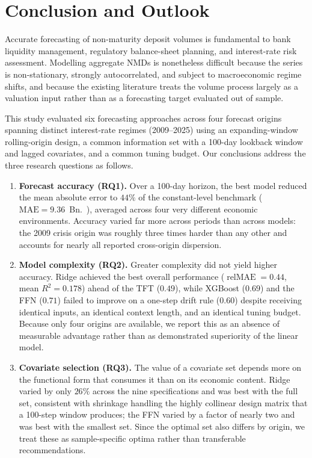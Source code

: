 \documentclass[11pt,a4paper]{article}
\begin{document}
\section{Conclusion and Outlook}
\label{sec:conclusion}

Accurate forecasting of non-maturity deposit volumes is fundamental to bank
liquidity management, regulatory balance-sheet planning, and interest-rate
risk assessment. Modelling aggregate NMDs is nonetheless difficult because the
series is non-stationary, strongly autocorrelated, and subject to
macroeconomic regime shifts, and because the existing literature treats the
volume process largely as a valuation input rather than as a forecasting
target evaluated out of sample.

This study evaluated six forecasting approaches across four forecast origins
spanning distinct interest-rate regimes (2009--2025) using an expanding-window
rolling-origin design, a common information set with a 100-day lookback window
and lagged covariates, and a common tuning budget. Our conclusions address the
three research questions as follows.

\begin{enumerate}
    \item \textbf{Forecast accuracy (RQ1).} Over a 100-day horizon, the best
    model reduced the mean absolute error to $44\%$ of the constant-level
    benchmark ($\text{MAE} = 9.36$~Bn.~\texteuro), averaged across four very
    different economic environments. Accuracy varied far more across periods
    than across models: the 2009 crisis origin was roughly three times harder
    than any other and accounts for nearly all reported cross-origin
    dispersion.
    \item \textbf{Model complexity (RQ2).} Greater complexity did not yield
    higher accuracy. Ridge achieved the best overall performance
    ($\operatorname{relMAE} = 0.44$, mean $R^2 = 0.178$) ahead of the TFT
    ($0.49$), while XGBoost ($0.69$) and the FFN ($0.71$) failed to improve on
    a one-step drift rule ($0.60$) despite receiving identical inputs, an
    identical context length, and an identical tuning budget. Because only
    four origins are available, we report this as an absence of measurable
    advantage rather than as demonstrated superiority of the linear model.
    \item \textbf{Covariate selection (RQ3).} The value of a covariate set
    depends more on the functional form that consumes it than on its economic
    content. Ridge varied by only $26\%$ across the nine specifications and
    was best with the full set, consistent with shrinkage handling the highly
    collinear design matrix that a 100-step window produces; the FFN varied by
    a factor of nearly two and was best with the smallest set. Since the
    optimal set also differs by origin, we treat these as sample-specific
    optima rather than transferable recommendations.
\end{enumerate}
\end{document}
